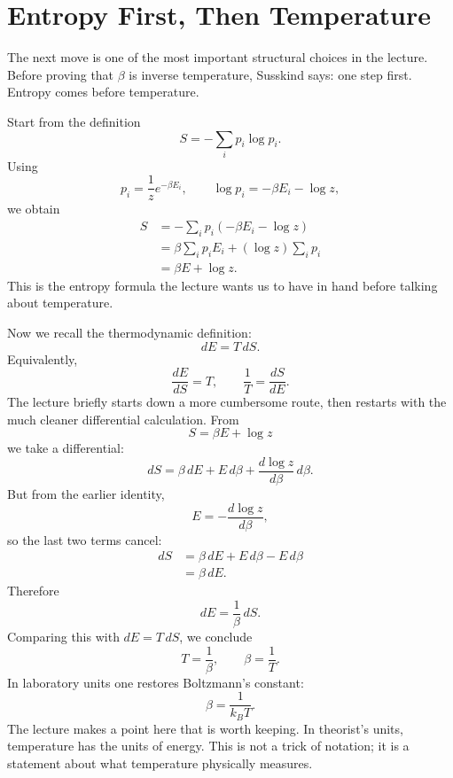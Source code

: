 \section{Entropy First, Then Temperature}

The next move is one of the most important structural choices in the lecture. Before proving that \(\beta\) is inverse temperature, Susskind says: one step first. Entropy comes before temperature.

Start from the definition
\begin{equation}
S=-\sum_i p_i\log p_i.
\end{equation}
Using
\begin{equation}
p_i=\frac{1}{z}e^{-\beta E_i},
\qquad
\log p_i=-\beta E_i-\log z,
\end{equation}
we obtain
\begin{align}
S
&=
-\sum_i p_i(-\beta E_i-\log z) \\
&=
\beta \sum_i p_i E_i + (\log z)\sum_i p_i \\
&=
\beta E+\log z.
\end{align}
This is the entropy formula the lecture wants us to have in hand before talking about temperature.

Now we recall the thermodynamic definition:
\begin{equation}
dE=T\,dS.
\end{equation}
Equivalently,
\begin{equation}
\frac{dE}{dS}=T,
\qquad
\frac{1}{T}=\frac{dS}{dE}.
\end{equation}
The lecture briefly starts down a more cumbersome route, then restarts with the much cleaner differential calculation. From
\begin{equation}
S=\beta E+\log z
\end{equation}
we take a differential:
\begin{equation}
dS=\beta\,dE+E\,d\beta+\frac{d\log z}{d\beta}\,d\beta.
\end{equation}
But from the earlier identity,
\begin{equation}
E=-\frac{d\log z}{d\beta},
\end{equation}
so the last two terms cancel:
\begin{align}
dS
&=
\beta\,dE+E\,d\beta-E\,d\beta \\
&=
\beta\,dE.
\end{align}
Therefore
\begin{equation}
dE=\frac{1}{\beta}\,dS.
\end{equation}
Comparing this with \(dE=T\,dS\), we conclude
\begin{equation}
T=\frac{1}{\beta},
\qquad
\beta=\frac{1}{T}.
\end{equation}
In laboratory units one restores Boltzmann's constant:
\begin{equation}
\beta=\frac{1}{k_B T}.
\end{equation}
The lecture makes a point here that is worth keeping. In theorist's units, temperature has the units of energy. This is not a trick of notation; it is a statement about what temperature physically measures.

